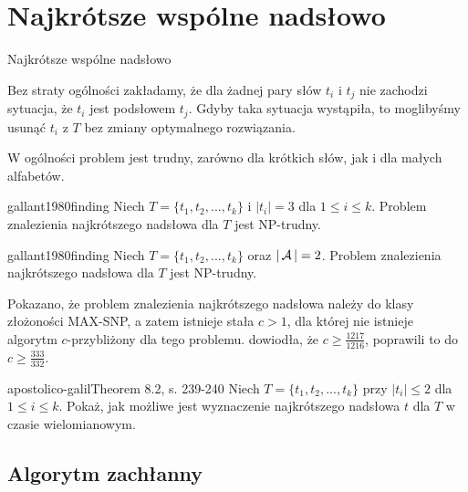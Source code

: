 \section{Najkrótsze wspólne nadsłowo}

\begin{algorithm}[H]
    \caption{Najkrótsze wspólne nadsłowo}
\end{algorithm}

Bez straty ogólności zakładamy, że dla żadnej pary słów $t_i$ i $t_j$ nie zachodzi sytuacja, że $t_i$ jest podsłowem $t_j$. Gdyby taka sytuacja wystąpiła, to moglibyśmy usunąć $t_i$ z $T$ bez zmiany optymalnego rozwiązania.

W ogólności problem jest trudny, zarówno dla krótkich słów, jak i dla małych alfabetów.
\begin{theorem}{gallant1980finding}{}
  Niech $T = \{t_1, t_2, ..., t_k\}$ i $|t_i| = 3$ dla $1 \le i \le k$.
  Problem znalezienia najkrótszego nadsłowa dla $T$ jest NP-trudny.
\end{theorem}

\begin{theorem}{gallant1980finding}{}
  Niech $T = \{t_1, t_2, ..., t_k\}$ oraz $|\operatorname{\mathcal{A}}| = 2$.
  Problem znalezienia najkrótszego nadsłowa dla $T$ jest NP-trudny.
\end{theorem}

Pokazano, że problem znalezienia najkrótszego nadsłowa należy do klasy złożoności MAX-SNP, a zatem istnieje stała $c > 1$, dla której nie istnieje algorytm $c$-przybliżony dla tego problemu. \citet{vassilevska2005explicit} dowiodła, że $c \ge \frac{1217}{1216}$, \citet{karpinski2013improved} poprawili to do $c \ge \frac{333}{332}$.

\begin{problem}{apostolico-galil}{Theorem 8.2, s. 239-240}
  Niech $T = \{t_1, t_2, ..., t_k\}$ przy $|t_i| \le 2$ dla $1 \le i \le k$.
  Pokaż, jak możliwe jest wyznaczenie najkrótszego nadsłowa $t$ dla $T$ w czasie wielomianowym.
\end{problem}

\subsection{Algorytm zachłanny}


